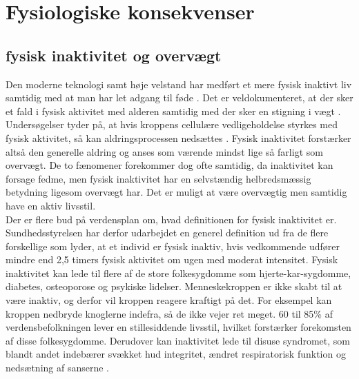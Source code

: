 \section{Fysiologiske konsekvenser}


\subsection{fysisk inaktivitet og overvægt}
Den moderne teknologi samt høje velstand har medført et mere fysisk inaktivt liv samtidig med at man har let adgang til føde \citep{Kiens2007}. Det er veldokumenteret, at der sker et fald i fysisk aktivitet med alderen samtidig med der sker en stigning i vægt \citep{Kaprio2008}. Undersøgelser tyder på, at hvis kroppens cellulære vedligeholdelse styrkes med fysisk aktivitet, så kan aldringsprocessen nedsættes \citep{Knight2012}. Fysisk inaktivitet forstærker altså den generelle aldring og anses som værende mindst lige så farligt som overvægt. De to fænomener forekommer dog ofte samtidig, da inaktivitet kan forsage fedme, men fysisk inaktivitet har en selvstændig helbredsmæssig betydning ligesom overvægt har. Det er muligt at være overvægtig men samtidig have en aktiv livsstil. \citep{Kiens2007,Kaprio2008,Hjort1997}\\
Der er flere bud på verdensplan om, hvad definitionen for fysisk inaktivitet er. Sundhedsstyrelsen har derfor udarbejdet en generel definition ud fra de flere forskellige som lyder, at et individ er fysisk inaktiv, hvis vedkommende udfører mindre end 2,5 timers fysisk aktivitet om ugen med moderat intensitet. \citep{kiens2007} Fysisk inaktivitet kan lede til flere af de store folkesygdomme som hjerte-kar-sygdomme, diabetes, osteoporose og psykiske lidelser. Menneskekroppen er ikke skabt til at være inaktiv, og derfor vil kroppen reagere kraftigt på det. For eksempel kan kroppen nedbryde knoglerne indefra, så de ikke vejer ret meget. 60 til 85\% af verdensbefolkningen lever en stillesiddende livsstil, hvilket forstærker forekomsten af disse folkesygdomme. \citep{kiens2007,Reshma2002april,Martini2012} Derudover kan inaktivitet lede til disuse syndromet, som blandt andet indebærer svækket hud integritet, ændret respiratorisk funktion og nedsætning af sanserne \citep{Knight2012,Mosby2009}. \\
